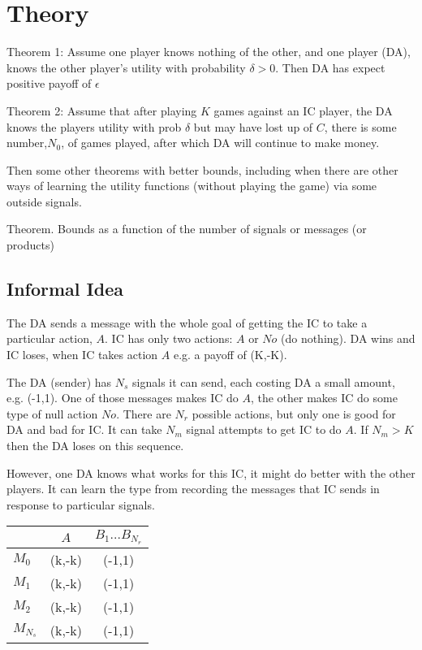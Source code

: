 \documentclass{article}
\begin{document}
\section{Theory}

Theorem 1:  Assume one player knows nothing of the other, and one
player (DA),  knows the other player's utility with probability $\delta >
0$.  Then DA  has expect positive payoff of   $\epsilon$ 

Theorem 2:  Assume that after playing $K$ games against an IC player,
the DA knows the players utility with prob $\delta$ but may have lost
up  of $C$,  there is some number,$N_0$, of games played, after which
DA will continue to make money.


Then some other theorems with better bounds, including when there are
other ways of learning the utility functions (without playing the
game) via some outside signals.

Theorem.   Bounds as a function of the number of signals or messages
(or products)


\subsection{Informal Idea}

The DA sends a message with the whole goal of getting the IC to take a
particular action, $A$.  IC has only two actions: $A$ or $No$ (do nothing).  
DA wins and IC loses, when IC takes action $A$ e.g. a payoff of  (K,-K).

The DA (sender) has $N_s$ signals  it can send, each costing DA a
small amount,  e.g. (-1,1). One of
those messages makes IC do $A$, the other makes IC do some type of
null action $No$.  There are $N_r$ possible actions, but only one is
good for DA and bad for IC.
It can
take  $N_m$ signal attempts to get   IC to do $A$.   If $N_m > K$ then the DA
loses on this sequence.

However, one DA knows what works for this IC, it might do better with
the other players.   It can learn the type from recording the messages
that IC sends in response to particular signals.


\begin{tabular}{l | c | c}
                    &  $A$      &   $B_1 ... B_{N_r}$          \\ \hline
$M_0$          & (k,-k)    & (-1,1)      \\ \hline
$M_1$          & (k,-k)    &   (-1,1)    \\ \hline
$M_2$          & (k,-k)    &   (-1,1)    \\ \hline
$M_{N_s}$      & (k,-k)    &   (-1,1)    \\ \hline
\end{tabular}
\end{document}
